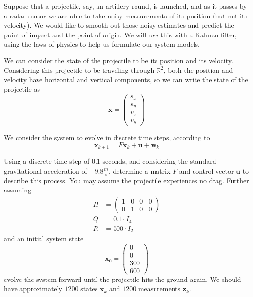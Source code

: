 
Suppose that a projectile, say, an artillery round, is launched, and as it passes by a radar sensor we are able to take noisy measurements of its position (but not its velocity). 
We would like to smooth out those noisy estimates and predict the point of impact and the point of origin. 
We will use this with a Kalman filter, using the laws of physics to help us formulate our system models.

We can consider the state of the projectile to be its position and its velocity. 
Considering this projectile to be traveling through $\mathbb{R}^{2}$, both the position and velocity have horizontal and vertical components, so we can write the state of the projectile as 
\begin{equation*}
\mathbf{x} = \left( \begin{array}{c} s_{x} \\ s_{y} \\ v_{x} \\ v_{y} \end{array} \right)
\end{equation*}

We consider the system to evolve in discrete time steps, according to 
\begin{equation*}
\mathbf{x}_{k+1} = F\mathbf{x}_{k} + \mathbf{u} + \mathbf{w}_{k}
\end{equation*}

\begin{problem}
Using a discrete time step of $0.1$ seconds, and considering the standard gravitational acceleration of $-9.8 \frac{m}{s}$, determine a matrix $F$ and control vector $\mathbf{u}$ to describe this process.
You may assume the projectile experiences no drag. Further assuming 
\begin{align*}
H & = \left( \begin{array}{cccc} 1 & 0 & 0 & 0 \\ 0 & 1 & 0 & 0 \end{array} \right) \\
Q & = 0.1 \cdot I_{4} \\
R & = 500 \cdot I_{2}
\end{align*}
and an initial system state 
\begin{equation*}
\mathbf{x}_{0} = \left( \begin{array}{c} 0 \\ 0 \\ 300 \\ 600 \end{array} \right)
\end{equation*}
evolve the system forward until the projectile hits the ground again.
We should have approximately $1200$ states $\mathbf{x}_{k}$ and $1200$ measurements $\mathbf{z}_{k}$.
\label{prob:target}
\end{problem}

